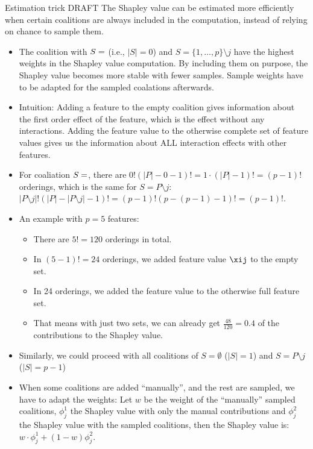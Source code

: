 \documentclass[11pt,compress,t,notes=noshow, xcolor=table]{beamer}
\begin{document}
\begin{vbframe}{Estimation trick}
  DRAFT
  The Shapley value can be estimated more efficiently when certain coalitions are always included in the computation, instead of relying on chance to sample them.
  \begin{itemize}
    \item The coalition with $S = \empty$ (i.e., $|S| = 0$) and $S = \{1, \ldots, p\} \setminus j$ have the highest weights in the Shapley value computation. By including them on purpose, the Shapley value becomes more stable with fewer samples. Sample weights have to be adapted for the sampled coalations afterwards.
    \item Intuition: Adding a feature to the empty coalition gives information about the first order effect of the feature, which is the effect without any interactions. Adding the feature value to the otherwise complete set of feature values gives us the information about ALL interaction effects with other features.
    \item For coaliation $S = \empty$, there are $0! (|P| - 0 - 1)! = 1 \cdot (|P| - 1)! = (p - 1)!$ orderings, which is the same for $S = P \setminus {j}$: $|P \setminus j|! (|P| - |P \setminus j| - 1)! = (p - 1)! (p - (p-1) - 1)! = (p-1)!$.
    \item An example with $p = 5$ features:
      \begin{itemize}
        \item There are $5! = 120$ orderings in total.
        \item In $(5 - 1)! = 24$ orderings, we added feature value $\xij$ to the empty set.
        \item In 24 orderings, we added the feature value to the otherwise full feature set.
        \item That means with just two sets, we can already get $\frac{48}{120} = 0.4$ of the contributions to the Shapley value. 
      \end{itemize}
    \item Similarly, we could proceed with all coalitions of $S = \emptyset$ ($|S| = 1$) and $S = P \setminus j$ ($|S| = p - 1$) 
    \item When some coalitions are added \enquote{manually}, and the rest are sampled, we have to adapt the weights: Let $w$ be the weight of the \enquote{manually} sampled coalitions, $\phi_j^1$ the Shapley value with only the manual contributions and $\phi_j^2$ the Shapley value with the sampled coalitions, then the Shapley value is: $w \cdot \phi_j^1 + (1 - w) \phi_j^2$.
  \end{itemize}
\end{vbframe}
\end{document}
